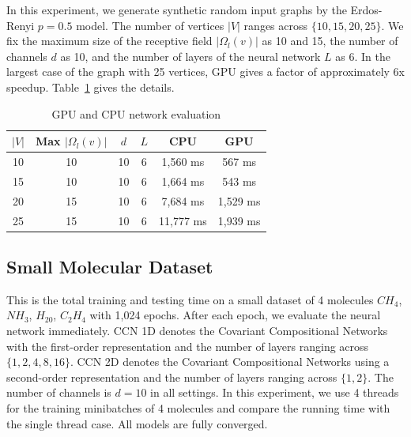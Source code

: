 \documentclass[a4paper]{article}
\begin{document}
In this experiment, we generate synthetic random input graphs by the Erdos-Renyi $p = 0.5$ model. The number of vertices $|V|$ ranges across $\{10, 15, 20, 25\}$. We fix the maximum size of the receptive field $|\Omega_l(v)|$ as 10 and 15, the number of channels $d$ as 10, and the number of layers of the neural network $L$ as 6. In the largest case of the graph with 25 vertices, GPU gives a factor of approximately 6x speedup. Table~\ref{tab:erdos_renyi} gives the details. 

\begin{table}[h]
\caption{GPU and CPU network evaluation}\label{tab:erdos_renyi}
\begin{tabular}{|| c | c | c | c | c | c ||}
	\hline
	$|V|$ & Max $|\Omega_l(v)|$ & $d$ & $L$ & CPU & GPU \\
	\hline\hline
	10 & 10 & 10 & 6 & 1,560 ms & 567 ms \\
	\hline
	15 & 10 & 10 & 6 & 1,664 ms & 543 ms \\
	\hline 
	20 & 15 & 10 & 6 & 7,684 ms & 1,529 ms \\
	\hline
	25 & 15 & 10 & 6 & 11,777 ms & 1,939 ms \\
	\hline
\end{tabular}
\end{table}

\subsection{Small Molecular Dataset}

This is the total training and testing time on a small dataset of 4 molecules $CH_4$, $NH_3$, $H_20$, $C_2H_4$ with 1,024 epochs. After each epoch, we evaluate the neural network immediately. CCN 1D denotes the Covariant Compositional Networks with the first-order representation and the number of layers ranging across $\{1, 2, 4, 8, 16\}$. CCN 2D denotes the Covariant Compositional Networks using a second-order representation and the number of layers ranging across $\{1, 2\}$. The number of channels is $d = 10$ in all settings. In this experiment, we use 4 threads for the training minibatches of 4 molecules and compare the running time with the single thread case. All models are fully converged.
\end{document}
